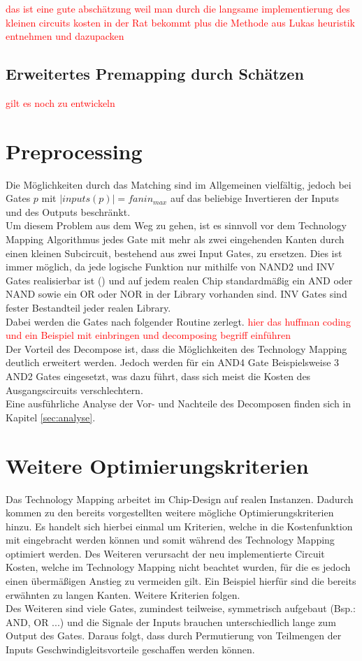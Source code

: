 \documentclass[11pt, a4paper, german]{article}
\newcommand{\TM}{Technology  Mapping }
\begin{document}
 \textcolor{red}{das ist eine gute abschätzung weil man durch die langsame implementierung des kleinen circuits kosten in der Rat bekommt plus die Methode aus Lukas heuristik entnehmen und dazupacken}


\subsection{Erweitertes Premapping durch Schätzen}
\label{subsec:erweitertes_premapping_durch_schaetzen}
\textcolor{red}{gilt es noch zu entwickeln} 

\section{Preprocessing}
Die Möglichkeiten durch das Matching sind im Allgemeinen vielfältig, jedoch bei Gates $p$ mit $|inputs(p)| = fanin_{max}$ auf das beliebige Invertieren der Inputs und des Outputs beschränkt. \\
Um diesem Problem aus dem Weg zu gehen, ist es sinnvoll vor dem \TM Algorithmus jedes Gate mit mehr als zwei eingehenden Kanten durch einen kleinen Subcircuit, bestehend aus zwei Input Gates, zu ersetzen. Dies ist immer möglich, da jede logische Funktion nur mithilfe von NAND2 und INV Gates realisierbar ist (\cite{Post}) und auf jedem realen Chip standardmäßig ein AND oder NAND sowie ein OR oder NOR in der Library vorhanden sind. INV Gates sind fester Bestandteil jeder realen Library.\\
Dabei werden die Gates nach folgender Routine zerlegt. \textcolor{red}{hier das huffman coding und ein Beispiel mit einbringen und decomposing begriff einführen}\\
Der Vorteil des Decompose ist, dass die Möglichkeiten des \TM deutlich erweitert werden. Jedoch werden für ein AND4 Gate Beispielsweise 3 AND2 Gates eingesetzt, was dazu führt, dass sich meist die Kosten des Ausgangscircuits verschlechtern.\\
Eine ausführliche Analyse der Vor- und Nachteile des Decomposen finden sich in Kapitel \ref{sec:analyse}.
	

\section{Weitere Optimierungskriterien}
\label{sec:weitere_opt_krit}
Das \TM arbeitet im Chip-Design auf realen Instanzen. Dadurch kommen zu den bereits vorgestellten weitere mögliche Optimierungskriterien hinzu. Es handelt sich hierbei einmal um Kriterien, welche in die Kostenfunktion mit eingebracht werden können und somit während des \TM optimiert werden. Des Weiteren verursacht der neu implementierte Circuit Kosten, welche im \TM nicht beachtet wurden, für die es jedoch einen übermäßigen Anstieg zu vermeiden gilt. Ein Beispiel hierfür sind die bereits erwähnten zu langen Kanten. Weitere Kriterien folgen.\\
Des Weiteren sind viele Gates, zumindest teilweise, symmetrisch aufgebaut (Bsp.: AND, OR ...) und die Signale der Inputs brauchen unterschiedlich lange zum Output des Gates. Daraus folgt, dass durch Permutierung von Teilmengen der Inputs Geschwindigleitsvorteile geschaffen werden können.  
\end{document}

